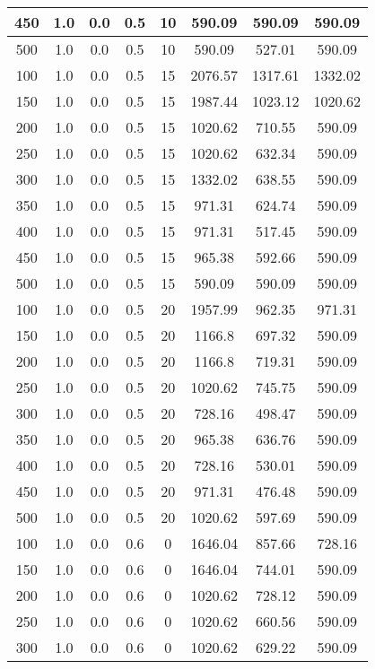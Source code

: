 \documentclass[a4paper, 12pt]{extreport}
\begin{document}
\begin{itemize}
\begin{longtable}{|c|c|c|c|c|c|c|c|}
			450 & 1.0 & 0.0 & 0.5 & 10 & 590.09 & 590.09 & 590.09 \\\hline
			500 & 1.0 & 0.0 & 0.5 & 10 & 590.09 & 527.01 & 590.09 \\\hline
			100 & 1.0 & 0.0 & 0.5 & 15 & 2076.57 & 1317.61 & 1332.02 \\\hline
			150 & 1.0 & 0.0 & 0.5 & 15 & 1987.44 & 1023.12 & 1020.62 \\\hline
			200 & 1.0 & 0.0 & 0.5 & 15 & 1020.62 & 710.55 & 590.09 \\\hline
			250 & 1.0 & 0.0 & 0.5 & 15 & 1020.62 & 632.34 & 590.09 \\\hline
			300 & 1.0 & 0.0 & 0.5 & 15 & 1332.02 & 638.55 & 590.09 \\\hline
			350 & 1.0 & 0.0 & 0.5 & 15 & 971.31 & 624.74 & 590.09 \\\hline
			400 & 1.0 & 0.0 & 0.5 & 15 & 971.31 & 517.45 & 590.09 \\\hline
			450 & 1.0 & 0.0 & 0.5 & 15 & 965.38 & 592.66 & 590.09 \\\hline
			500 & 1.0 & 0.0 & 0.5 & 15 & 590.09 & 590.09 & 590.09 \\\hline
			100 & 1.0 & 0.0 & 0.5 & 20 & 1957.99 & 962.35 & 971.31 \\\hline
			150 & 1.0 & 0.0 & 0.5 & 20 & 1166.8 & 697.32 & 590.09 \\\hline
			200 & 1.0 & 0.0 & 0.5 & 20 & 1166.8 & 719.31 & 590.09 \\\hline
			250 & 1.0 & 0.0 & 0.5 & 20 & 1020.62 & 745.75 & 590.09 \\\hline
			300 & 1.0 & 0.0 & 0.5 & 20 & 728.16 & 498.47 & 590.09 \\\hline
			350 & 1.0 & 0.0 & 0.5 & 20 & 965.38 & 636.76 & 590.09 \\\hline
			400 & 1.0 & 0.0 & 0.5 & 20 & 728.16 & 530.01 & 590.09 \\\hline
			450 & 1.0 & 0.0 & 0.5 & 20 & 971.31 & 476.48 & 590.09 \\\hline
			500 & 1.0 & 0.0 & 0.5 & 20 & 1020.62 & 597.69 & 590.09 \\\hline
			100 & 1.0 & 0.0 & 0.6 & 0 & 1646.04 & 857.66 & 728.16 \\\hline
			150 & 1.0 & 0.0 & 0.6 & 0 & 1646.04 & 744.01 & 590.09 \\\hline
			200 & 1.0 & 0.0 & 0.6 & 0 & 1020.62 & 728.12 & 590.09 \\\hline
			250 & 1.0 & 0.0 & 0.6 & 0 & 1020.62 & 660.56 & 590.09 \\\hline
			300 & 1.0 & 0.0 & 0.6 & 0 & 1020.62 & 629.22 & 590.09 \\\hline

\end{longtable}
\end{itemize}
\end{document}
